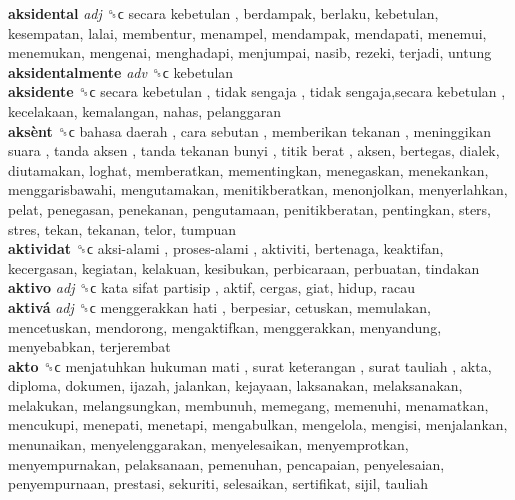 \textbf{aksidental} \emph{adj}  ␝ϲ   secara kebetulan , berdampak, berlaku, kebetulan, kesempatan, lalai, membentur, menampel, mendampak, mendapati, menemui, menemukan, mengenai, menghadapi, menjumpai, nasib, rezeki, terjadi, untung  \\
\textbf{aksidentalmente} \emph{adv}  ␝ϲ  kebetulan  \\
\textbf{aksidente} ␝ϲ   secara kebetulan ,  tidak sengaja ,  tidak sengaja,secara kebetulan , kecelakaan, kemalangan, nahas, pelanggaran  \\
\textbf{aksènt} ␝ϲ   bahasa daerah ,  cara sebutan ,  memberikan tekanan ,  meninggikan suara ,  tanda aksen ,  tanda tekanan bunyi ,  titik berat , aksen, bertegas, dialek, diutamakan, loghat, memberatkan, mementingkan, menegaskan, menekankan, menggarisbawahi, mengutamakan, menitikberatkan, menonjolkan, menyerlahkan, pelat, penegasan, penekanan, pengutamaan, penitikberatan, pentingkan, sters, stres, tekan, tekanan, telor, tumpuan  \\
\textbf{aktividat} ␝ϲ   aksi-alami ,  proses-alami , aktiviti, bertenaga, keaktifan, kecergasan, kegiatan, kelakuan, kesibukan, perbicaraan, perbuatan, tindakan  \\
\textbf{aktivo} \emph{adj}  ␝ϲ   kata sifat partisip , aktif, cergas, giat, hidup, racau  \\
\textbf{aktivá} \emph{adj}  ␝ϲ   menggerakkan hati , berpesiar, cetuskan, memulakan, mencetuskan, mendorong, mengaktifkan, menggerakkan, menyandung, menyebabkan, terjerembat  \\
\textbf{akto} ␝ϲ   menjatuhkan hukuman mati ,  surat keterangan ,  surat tauliah , akta, diploma, dokumen, ijazah, jalankan, kejayaan, laksanakan, melaksanakan, melakukan, melangsungkan, membunuh, memegang, memenuhi, menamatkan, mencukupi, menepati, menetapi, mengabulkan, mengelola, mengisi, menjalankan, menunaikan, menyelenggarakan, menyelesaikan, menyemprotkan, menyempurnakan, pelaksanaan, pemenuhan, pencapaian, penyelesaian, penyempurnaan, prestasi, sekuriti, selesaikan, sertifikat, sijil, tauliah  \\
